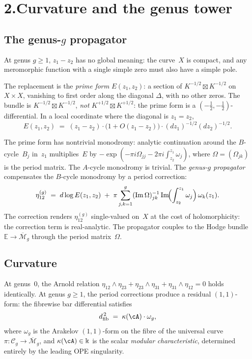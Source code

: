 \section*{2.\quad Curvature and the genus tower}

\subsection*{The genus-$g$ propagator}

At genus $g\ge 1$, $z_1-z_2$ has no global meaning: the
curve~$X$ is compact, and any meromorphic function with a single
simple zero must also have a simple pole.

The replacement is the \emph{prime form} $E(z_1,z_2)$: a section
of $K^{-1/2}\boxtimes K^{-1/2}$ on $X\times X$, vanishing to
first order along the diagonal $\Delta$, with no other zeros.
The bundle is $K^{-1/2}\boxtimes K^{-1/2}$, \emph{not}
$K^{+1/2}\boxtimes K^{+1/2}$: the prime form is a
$(-\frac12,-\frac12)$-differential. In a local coordinate
where the diagonal is $z_1=z_2$,
\[
E(z_1,z_2)
\;=\;
(z_1-z_2)\cdot\bigl(1+O(z_1-z_2)\bigr)
\cdot(dz_1)^{-1/2}(dz_2)^{-1/2}.
\]

The prime form has nontrivial monodromy: analytic continuation
around the $B$-cycle~$B_j$ in~$z_1$ multiplies~$E$ by
$-\exp(-\pi i\Omega_{jj}-2\pi i\int_{z_2}^{z_1}\omega_j)$,
where $\Omega=(\Omega_{jk})$ is the period matrix. The
$A$-cycle monodromy is trivial. The \emph{genus-$g$ propagator}
compensates the $B$-cycle monodromy by a period correction:
\[
\eta^{(g)}_{12}
\;=\;
d\log E(z_1,z_2)
\;+\;
\pi\sum_{j,k=1}^{g}
(\mathrm{Im}\,\Omega)^{-1}_{jk}\,
\mathrm{Im}\!\Bigl(\int_{z_2}^{z_1}\omega_j\Bigr)\,
\omega_k(z_1).
\]
The correction renders $\eta^{(g)}_{12}$
single-valued on~$X$ at the cost of holomorphicity: the
correction term is real-analytic. The propagator couples
to the Hodge bundle
$\mathbb E\to\overline{\mathcal M}_g$ through the period
matrix~$\Omega$.

\subsection*{Curvature}

At genus~$0$, the Arnold relation
$\eta_{12}\wedge\eta_{23}
+\eta_{23}\wedge\eta_{31}
+\eta_{31}\wedge\eta_{12}=0$
holds identically. At genus $g\ge 1$, the period corrections
produce a residual $(1,1)$-form: the fibrewise bar differential satisfies
\begin{equation}\label{eq:pref-curvature}
d_{\mathrm{fib}}^{\,2}\;=\;\kappa(\cA)\cdot\omega_g,
\end{equation}
where $\omega_g$ is the Arakelov $(1,1)$-form on the fibre of the
universal curve $\pi\colon\mathcal C_g\to\overline{\mathcal M}_g$,
and $\kappa(\cA)\in\Bbbk$ is the scalar \emph{modular
characteristic}, determined entirely by the leading OPE singularity.

